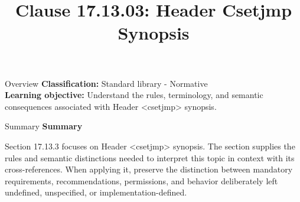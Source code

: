 \documentclass[10pt,letterpaper]{article}
\title{Clause 17.13.03: Header Csetjmp Synopsis}
\author{}
\date{}
\begin{document}
\maketitle
\begin{CornellOverviewBox}{Overview}
\textbf{Classification:} Standard library - Normative\\[2pt]
\textbf{Learning objective:} Understand the rules, terminology, and semantic consequences associated with Header <csetjmp> synopsis.
\end{CornellOverviewBox}\begin{CornellSummaryBox}{Summary}
{\sffamily\bfseries\color{Accent} Summary}\par\vspace{3pt}Section 17.13.3 focuses on Header <csetjmp> synopsis. The section supplies the rules and semantic distinctions needed to interpret this topic in context with its cross-references. When applying it, preserve the distinction between mandatory requirements, recommendations, permissions, and behavior deliberately left undefined, unspecified, or implementation-defined.
\end{CornellSummaryBox}
\end{document}
